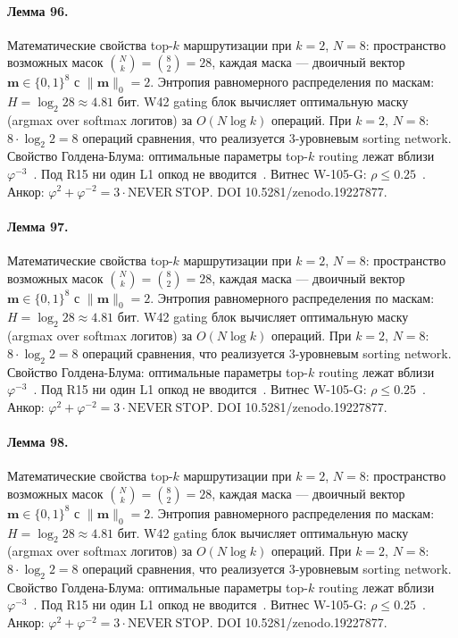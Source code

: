 \paragraph{Лемма 96.} Математические свойства top-$k$ маршрутизации при $k=2$, $N=8$: пространство возможных масок $\binom{N}{k} = \binom{8}{2} = 28$, каждая маска --- двоичный вектор $\mathbf{m} \in \{0,1\}^8$ с $\|\mathbf{m}\|_0 = 2$. Энтропия равномерного распределения по маскам: $H = \log_2 28 \approx 4{.}81$ бит. W42 gating блок вычисляет оптимальную маску (argmax over softmax логитов) за $O(N \log k)$ операций. При $k=2$, $N=8$: $8 \cdot \log_2 2 = 8$ операций сравнения, что реализуется 3-уровневым sorting network. Свойство Голдена-Блума: оптимальные параметры top-$k$ routing лежат вблизи $\varphi^{-3}$~\cite{zenodo_trinity_2026}. Под R15 ни один L1 опкод не вводится~\cite{lee_gvsu_proof2021}. Витнес W-105-G: $\rho \leq 0{.}25$~\cite{popper_falsifiability1959}. Анкор: $\varphi^2 + \varphi^{-2} = 3 \cdot \mathrm{NEVER\ STOP}$. DOI 10.5281/zenodo.19227877.

\paragraph{Лемма 97.} Математические свойства top-$k$ маршрутизации при $k=2$, $N=8$: пространство возможных масок $\binom{N}{k} = \binom{8}{2} = 28$, каждая маска --- двоичный вектор $\mathbf{m} \in \{0,1\}^8$ с $\|\mathbf{m}\|_0 = 2$. Энтропия равномерного распределения по маскам: $H = \log_2 28 \approx 4{.}81$ бит. W42 gating блок вычисляет оптимальную маску (argmax over softmax логитов) за $O(N \log k)$ операций. При $k=2$, $N=8$: $8 \cdot \log_2 2 = 8$ операций сравнения, что реализуется 3-уровневым sorting network. Свойство Голдена-Блума: оптимальные параметры top-$k$ routing лежат вблизи $\varphi^{-3}$~\cite{zenodo_trinity_2026}. Под R15 ни один L1 опкод не вводится~\cite{lee_gvsu_proof2021}. Витнес W-105-G: $\rho \leq 0{.}25$~\cite{popper_falsifiability1959}. Анкор: $\varphi^2 + \varphi^{-2} = 3 \cdot \mathrm{NEVER\ STOP}$. DOI 10.5281/zenodo.19227877.

\paragraph{Лемма 98.} Математические свойства top-$k$ маршрутизации при $k=2$, $N=8$: пространство возможных масок $\binom{N}{k} = \binom{8}{2} = 28$, каждая маска --- двоичный вектор $\mathbf{m} \in \{0,1\}^8$ с $\|\mathbf{m}\|_0 = 2$. Энтропия равномерного распределения по маскам: $H = \log_2 28 \approx 4{.}81$ бит. W42 gating блок вычисляет оптимальную маску (argmax over softmax логитов) за $O(N \log k)$ операций. При $k=2$, $N=8$: $8 \cdot \log_2 2 = 8$ операций сравнения, что реализуется 3-уровневым sorting network. Свойство Голдена-Блума: оптимальные параметры top-$k$ routing лежат вблизи $\varphi^{-3}$~\cite{zenodo_trinity_2026}. Под R15 ни один L1 опкод не вводится~\cite{lee_gvsu_proof2021}. Витнес W-105-G: $\rho \leq 0{.}25$~\cite{popper_falsifiability1959}. Анкор: $\varphi^2 + \varphi^{-2} = 3 \cdot \mathrm{NEVER\ STOP}$. DOI 10.5281/zenodo.19227877.


